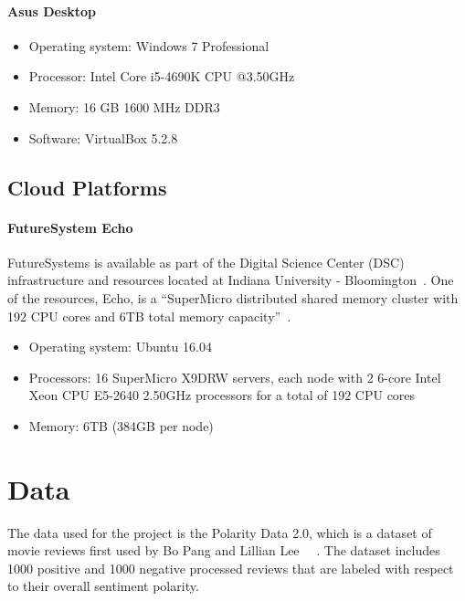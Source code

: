 \paragraph{Asus Desktop}
\begin{itemize}
	\item Operating system: Windows 7 Professional
	\item Processor: Intel Core i5-4690K CPU @3.50GHz
	\item Memory: 16 GB 1600 MHz DDR3
	\item Software: VirtualBox 5.2.8
\end{itemize}

\subsection{Cloud Platforms}
\paragraph{FutureSystem Echo}  FutureSystems is available as part of the 
Digital Science Center (DSC) infrastructure and resources located at 
Indiana University - Bloomington~\cite{las18handbook}. One of the 
resources, Echo, is a ``SuperMicro distributed shared memory cluster with 
192 CPU cores and 6TB total memory capacity''~\cite{las18handbook}. 

\begin{itemize}
	\item Operating system: Ubuntu 16.04
	\item Processors: 16 SuperMicro X9DRW servers, each node
        with 2 6-core Intel Xeon CPU E5-2640 2.50GHz
        processors for a total of 192 CPU cores
	\item Memory: 6TB (384GB per node)
\end{itemize}


\section{Data}\label{s:data}

The data used for the project is the Polarity Data 2.0, which is a
dataset of movie reviews first used by Bo Pang and Lillian
Lee~\cite{hid-sp18-405-sentiment-pang2004asentimental}
~\cite{hid-sp18-405-sentiment-pang2002thumbs}.
The dataset includes 1000 positive and 1000 negative processed
reviews that are labeled with respect to their overall sentiment
polarity.

